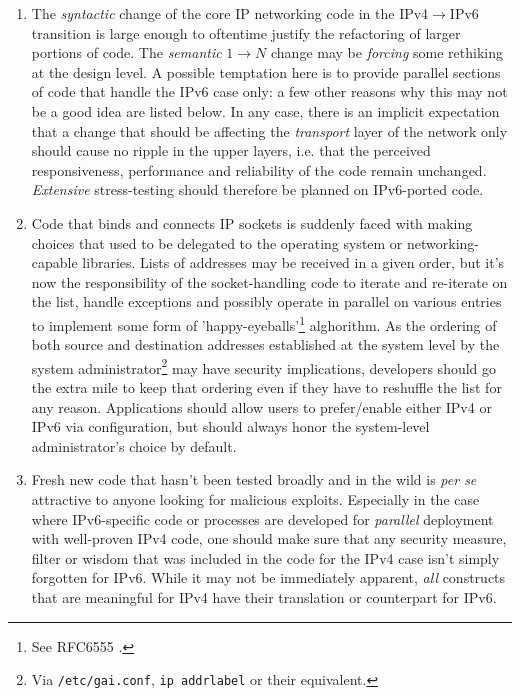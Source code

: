 \begin{enumerate}
\item The {\it syntactic} change of the core IP networking code in the
      IPv4$\rightarrow$IPv6 transition is large enough to oftentime
      justify the refactoring of larger portions of code. The 
      {\it semantic} $1\rightarrow N$ change may be {\it forcing}
      some rethiking at the design level. A possible temptation here
      is to provide parallel sections of code that handle the IPv6 case
      only: a few other reasons why this may not be a good idea are
      listed below. In any case, there is an implicit expectation that 
      a change that should be affecting the {\it transport} layer of
      the network only should cause no ripple in the upper layers, i.e.
      that the perceived responsiveness, performance and reliability
      of the code remain unchanged. {\it Extensive} stress-testing should
      therefore be planned on IPv6-ported code. 
\item Code that binds and connects IP sockets is suddenly faced with 
      making choices that used to be delegated to the operating system or
      networking-capable libraries. Lists of addresses may be received in
      a given order, but it's now the responsibility of the socket-handling
      code to iterate and re-iterate on the list, handle exceptions and
      possibly operate in parallel on various entries
      to implement some form of 'happy-eyeballs'\footnote{See RFC6555 \cite{rfc}.}
      alghorithm. As the ordering of both source and destination addresses
      established at the system level by the system
      administrator\footnote{Via {\tt /etc/gai.conf}, {\tt ip addrlabel} or their equivalent.}
      may have security implications, developers should go the extra mile to 
      keep that ordering even if they have to reshuffle the list for any reason.
      Applications should allow users to prefer/enable either IPv4 or IPv6 via
      configuration, but should always honor the system-level administrator's choice 
      by default.
\item Fresh new code that hasn't been tested broadly and in the 
      wild is {\it per se} attractive to anyone looking for
      malicious exploits. Especially in the case where IPv6-specific
      code or processes are developed for {\it parallel} deployment with
      well-proven IPv4 code, one should make sure that any security measure,
      filter or wisdom that was included in the code for the IPv4 case isn't
      simply forgotten for IPv6. While it may not be immediately apparent,
      {\it all} constructs that are meaningful for IPv4 have their
      translation or counterpart for IPv6.
\end{enumerate}
